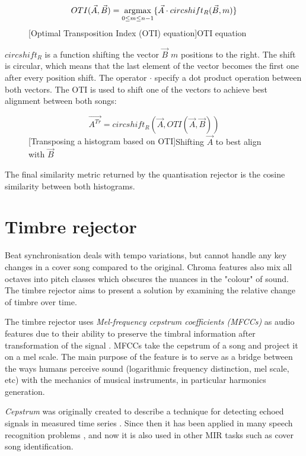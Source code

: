 \begin{figure}[H]
   \begin{equation}
       OTI(\vec{A}, \vec{B}) = \operatorname*{argmax}_{0 \leq m \leq {n-1}}\{\vec{A} \cdot circshift_{R}(\vec{B}, m)\}
   \end{equation}
   [Optimal Transposition Index (OTI) equation]{OTI equation}
\end{figure}

$circshift_R$ is a function shifting the vector $\vec{B}$ $m$ positions to the
right. The shift is circular, which means that the last element of the vector
becomes the first one after every position shift. The operator $\cdot$ specify a
dot product operation between both vectors. The OTI is used to shift one of the
vectors to achieve best alignment between both songs:
\begin{figure}[H]
\begin{equation}
    \vec{A^{Tr}} = circshift_R(\vec{A}, OTI(\vec{A}, \vec{B})) 
\end{equation}
[Transposing a histogram based on OTI]{Shifting $\vec{A}$ to best align with $\vec{B}$}
\end{figure}

The final similarity metric returned
by the quantisation rejector is the cosine similarity between both histograms.

\section{Timbre rejector} 
\label{sec:timbre}
Beat synchronisation deals with tempo variations, but cannot handle any key
changes in a cover song compared to the original. Chroma features also mix all
octaves into pitch classes which obscures the nuances in the "colour" of sound.
The timbre rejector aims to present a solution by examining the relative change
of timbre over time.

The timbre rejector uses \textit{Mel-frequency cepstrum coefficients (MFCCs)} as
audio features due to their ability to preserve the timbral information after
transformation of the signal \cite{tralie2015cover}. MFCCs take the cepstrum of
a song and project it on a mel scale. The main purpose of the feature is to
serve as a bridge between the ways humans perceive sound (logarithmic frequency
distinction, mel scale, etc) with the mechanics of musical instruments, in
particular harmonics generation.

\textit{Cepstrum} was originally created to describe a technique for detecting
echoed signals in measured time series \cite{martin1986power}. Since then it has
been applied in many speech recognition problems \cite{muda2010voice}
\cite{viikki1998cepstral}, and now it is also used in other MIR tasks such as
cover song identification.

